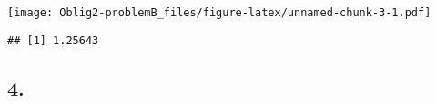 \documentclass[
]{article}
\newenvironment{Shaded}{\begin{snugshade}}{\end{snugshade}}
\newcommand{\DataTypeTok}[1]{\textcolor[rgb]{0.13,0.29,0.53}{#1}}
\newcommand{\DecValTok}[1]{\textcolor[rgb]{0.00,0.00,0.81}{#1}}
\newcommand{\KeywordTok}[1]{\textcolor[rgb]{0.13,0.29,0.53}{\textbf{#1}}}
\newcommand{\NormalTok}[1]{#1}
\newcommand{\OperatorTok}[1]{\textcolor[rgb]{0.81,0.36,0.00}{\textbf{#1}}}
\newcommand{\OtherTok}[1]{\textcolor[rgb]{0.56,0.35,0.01}{#1}}
\newcommand{\StringTok}[1]{\textcolor[rgb]{0.31,0.60,0.02}{#1}}
\begin{document}
\texttt{[image: Oblig2-problemB\_files/figure-latex/unnamed-chunk-3-1.pdf]}

\begin{Shaded}
\end{Shaded}

\begin{verbatim}
## [1] 1.25643
\end{verbatim}

\hypertarget{section-3}{%
\subsection{4.}\label{section-3}}
\end{document}
